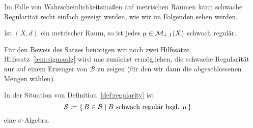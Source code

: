 \documentclass[../main/main.tex]{subfiles}
\begin{document}
	Im Falle von Wahrscheinlichkeitsmaßen auf metrischen Räumen kann schwache Regularität 
	recht einfach gezeigt werden, wie wir im Folgenden sehen werden.

	\begin{Satz}
		\label{thm:weakregularity}
		Ist $(X, d)$ ein metrischer Raum, so ist jedes $\mu \in \mathcal{M}_{+,1}(X)$ schwach regulär.
	\end{Satz}

	Für den Beweis des Satzes benötigen wir noch zwei Hilfssätze. Hilfssatz~\ref{lem:sigmaalg} wird 
	uns zunächst ermöglichen, die schwache Regularität nur auf einem Erzeuger von $\mathcal{B}$ 
	zu zeigen (für den wir dann die abgeschlossenen Mengen wählen).
	
	\begin{Hilfssatz}
		\label{lem:sigmaalg}
		In der Situation von Definition~\ref{def:regularity} ist
		$$\mathcal{S} \vcentcolon = \left\{\, B \in \mathcal{B} \; | \; B \text{ schwach regulär bzgl. } \mu \,\right\}$$
		eine $\sigma$-Algebra.
	\end{Hilfssatz}
	
\end{document}
